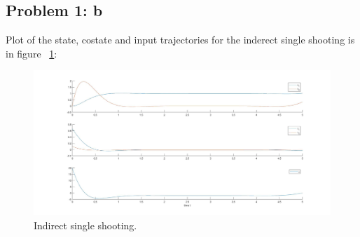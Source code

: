 \subsection{Problem 1: b}

Plot of the state, costate and input trajectories for the inderect single shooting is in figure \Fig~\ref{fig:indirect}:
\begin{figure}[h]
	\centering
	\includegraphics[width=0.8\linewidth]{ImageFiles/indirect}
	\caption{Indirect single shooting.}
	\label{fig:indirect}
\end{figure}
